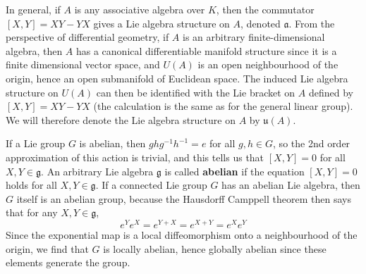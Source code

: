\begin{example}
    In general, if $A$ is any associative algebra over $K$, then the commutator $[X,Y] = XY - YX$ gives a Lie algebra structure on $A$, denoted $\mathfrak{a}$. From the perspective of differential geometry, if $A$ is an arbitrary finite-dimensional algebra, then $A$ has a canonical differentiable manifold structure since it is a finite dimensional vector space, and $U(A)$ is an open neighbourhood of the origin, hence an open submanifold of Euclidean space. The induced Lie algebra structure on $U(A)$ can then be identified with the Lie bracket on $A$ defined by $[X,Y] = XY - YX$ (the calculation is the same as for the general linear group). We will therefore denote the Lie algebra structure on $A$ by $\mathfrak{u}(A)$.
\end{example}

\begin{example}
    If a Lie group $G$ is abelian, then $ghg^{-1}h^{-1} = e$ for all $g,h \in G$, so the 2nd order approximation of this action is trivial, and this tells us that $[X,Y] = 0$ for all $X,Y \in \mathfrak{g}$. An arbitrary Lie algebra $\mathfrak{g}$ is called {\bf abelian} if the equation $[X,Y] = 0$ holds for all $X,Y \in \mathfrak{g}$. If a connected Lie group $G$ has an abelian Lie algebra, then $G$ itself is an abelian group, because the Hausdorff Camppell theorem then says that for any $X,Y \in \mathfrak{g}$,
    \[ e^Y e^X = e^{Y + X} = e^{X + Y} = e^X e^Y \]
    Since the exponential map is a local diffeomorphism onto a neighbourhood of the origin, we find that $G$ is locally abelian, hence globally abelian since these elements generate the group.
\end{example}

